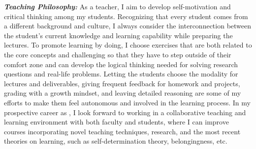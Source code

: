 \documentclass[9pt]{article}
\renewcommand*\paragraph[1]{}
\begin{document}
%
\textbf{\textit{Teaching Philosophy:}}
As a teacher, I aim to develop self-motivation and critical thinking among my students. Recognizing that every student comes from a different background and culture, I always consider the interconnection between the student's current knowledge and learning capability while preparing the lectures. To promote learning by doing, I choose exercises that are both related to the core concepts and challenging so that they have to step outside of their comfort zone and can develop the logical thinking needed for solving research questions and real-life problems. Letting the students choose the modality for lectures and deliverables, giving frequent feedback for homework and projects, grading with a growth mindset, and leaving detailed reasoning are some of my efforts to make them feel autonomous and involved in the learning process. In my prospective career as \PositionName{}, I look forward to working in a collaborative teaching and learning environment with both faculty and students, where I can improve courses incorporating novel teaching  techniques, research, and the most recent theories on learning, such as self-determination theory, belongingness, etc. 


\end{document}
